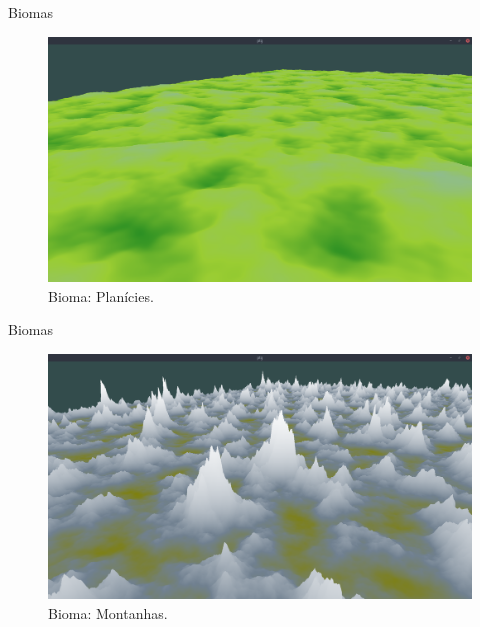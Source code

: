 \begin{frame}{Biomas}
    \begin{figure}[H]
        \centering
        \includegraphics[width=.9\textwidth]{img/biomas/bssPlains.png}
        \caption{Bioma: Planícies.}
        \label{fig:img_biomas_bssPlains}
    \end{figure}
    
    
\end{frame}

\begin{frame}{Biomas}
    \begin{figure}[H]
        \centering
        \includegraphics[width=.9\textwidth]{img/biomas/bssMontains.png}
        \caption{Bioma: Montanhas.}
        \label{fig:img_biomas_bssMontains}
    \end{figure}
    
    
\end{frame}

